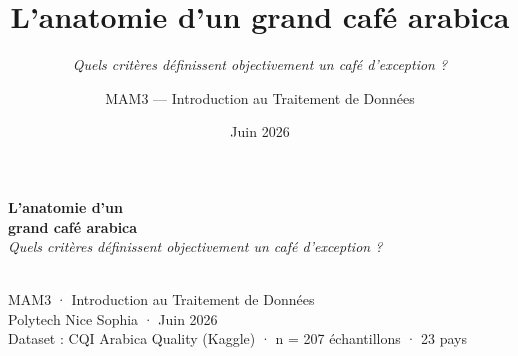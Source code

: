 \documentclass[aspectratio=169,12pt]{beamer}
\title{L'anatomie d'un grand café arabica}
\subtitle{\textit{Quels critères définissent objectivement un café d'exception ?}}
\author{MAM3 — Introduction au Traitement de Données}
\institute{Polytech Nice Sophia · Université Côte d'Azur}
\date{Juin 2026}
\begin{document}

{
\begin{frame}[plain]
  \vspace{0.8cm}
  \begin{center}
    {\Huge\bfseries\textcolor{coffeecream}{L'anatomie d'un}\\[0.2cm]
     \textcolor{coffeegold}{grand café arabica}}\\[0.5cm]
    {\large\textcolor{coffeecream!80}{\textit{Quels critères définissent objectivement un café d'exception ?}}}\\[1cm]
    \\[0.5cm]
    {\normalsize\textcolor{coffeecream!70}{MAM3 · Introduction au Traitement de Données}}\\
    {\normalsize\textcolor{coffeecream!70}{Polytech Nice Sophia · Juin 2026}}\\[0.5cm]
    {\small\textcolor{coffeecream!60}{Dataset : CQI Arabica Quality (Kaggle) · n = 207 échantillons · 23 pays}}
  \end{center}
\end{frame}
}
\end{document}
